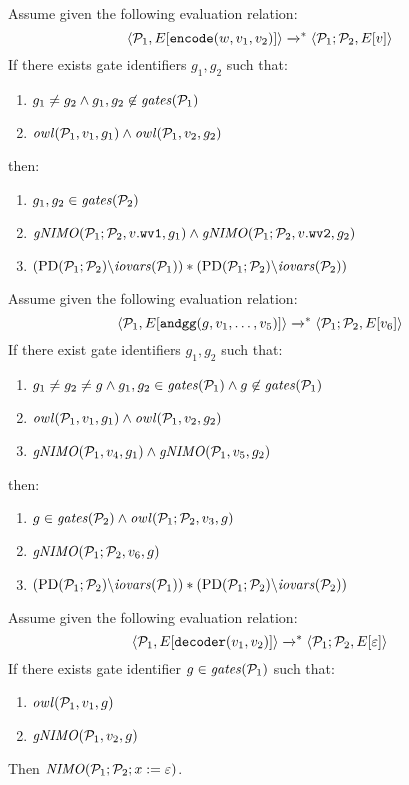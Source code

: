 \begin{lemma}
Assume given the following evaluation relation:
$$
\langle \mathcal{P}_1,E[\texttt{encode}(w,v_1,v_2)] \rangle \xrightarrow{}^{*} \langle \mathcal{P}_1;\mathcal{P}_2,E[v] \rangle
$$
If there exists gate identifiers $g_1, g_2$ such that:
\begin{enumerate}
  \item $g_1 \ne g_2 \wedge g_1,g_2 \not\in \mathit{gates}(\mathcal{P}_1)$
  \item $\mathit{owl}(\mathcal{P}_1,v_1,g_1) \wedge \mathit{owl}(\mathcal{P}_1,v_2,g_2)$
\end{enumerate}
then:
\begin{enumerate}
\item $g_1,g_2 \in  \mathit{gates}(\mathcal{P}_2)$
\item $\mathit{gNIMO}(\mathcal{P}_1;\mathcal{P}_2,v.\texttt{wv1},g_1) \wedge \mathit{gNIMO}(\mathcal{P}_1;\mathcal{P}_2,v.\texttt{wv2},g_2)$
\item $(\mathrm{PD}(\mathcal{P}_1;\mathcal{P}_2)\backslash\mathit{iovars}(\mathcal{P}_1)) * (\mathrm{PD}(\mathcal{P}_1;\mathcal{P}_2)\backslash\mathit{iovars}(\mathcal{P}_2))$
\end{enumerate}
\end{lemma}

\begin{lemma}
Assume given the following evaluation relation:
$$
\langle \mathcal{P}_1,E[\texttt{andgg}(g,v_1,\ldots,v_5)] \rangle \xrightarrow{}^{*} \langle \mathcal{P}_1;\mathcal{P}_2,E[v_6] \rangle
$$
If there exist gate identifiers $g_1, g_2$ such that:
\begin{enumerate}
  \item $g_1 \ne g_2 \ne g \wedge g_1,g_2 \in \mathit{gates}(\mathcal{P}_1) \wedge g \not\in \mathit{gates}(\mathcal{P}_1)$
  \item $\mathit{owl}(\mathcal{P}_1,v_1,g_1) \wedge \mathit{owl}(\mathcal{P}_1,v_2,g_2)$
  \item $\mathit{gNIMO}(\mathcal{P}_1,v_4,g_1) \wedge \mathit{gNIMO}(\mathcal{P}_1,v_5,g_2)$
\end{enumerate}
then:
\begin{enumerate}
  \item $g \in \mathit{gates}(\mathcal{P}_2) \wedge \mathit{owl}(\mathcal{P}_1;\mathcal{P}_2,v_3,g)$
  \item $\mathit{gNIMO}(\mathcal{P}_1;\mathcal{P}_2,v_6,g)$
  \item $(\mathrm{PD}(\mathcal{P}_1;\mathcal{P}_2)\backslash\mathit{iovars}(\mathcal{P}_1)) * (\mathrm{PD}(\mathcal{P}_1;\mathcal{P}_2)\backslash\mathit{iovars}(\mathcal{P}_2))$
\end{enumerate}
\end{lemma}

\begin{lemma}[Decoding]
Assume given the following evaluation relation:
$$
\langle \mathcal{P}_1,E[\texttt{decoder}(v_1,v_2)] \rangle \xrightarrow{}^{*} \langle \mathcal{P}_1;\mathcal{P}_2,E[\varepsilon] \rangle
$$
If there exists gate identifier $g \in \mathit{gates}(\mathcal{P}_1)$ such that:
\begin{enumerate}
  \item $\mathit{owl}(\mathcal{P}_1,v_1,g)$
  \item $\mathit{gNIMO}(\mathcal{P}_1,v_2,g)$
\end{enumerate}
Then $\mathit{NIMO}(\mathcal{P}_1;\mathcal{P}_2;x := \varepsilon)$.
\end{lemma}
